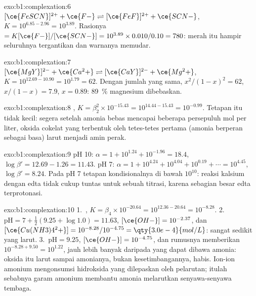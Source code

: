 \begin{solution}{exo:b1:complexation:6}
$[\ce{FeSCN}]^{2+} + \ce{F-} \rightleftharpoons [\ce{FeF}]^{2+} + \ce{SCN-}$,
$K = 10^{6.85 - 2.96} = 10^{3.89}$. Rasionya $= K[\ce{F-}]/[\ce{SCN-}] =
10^{3.89} \times 0.010/0.10 = 780$:  merah itu hampir seluruhnya
tergantikan dan warnanya memudar.
\end{solution}

\begin{solution}{exo:b1:complexation:7}
$[\ce{MgY}]^{2-} + \ce{Ca^2+} \rightleftharpoons [\ce{CaY}]^{2-} + \ce{Mg^2+}$,
$K = 10^{12.69 - 10.90} = 10^{1.79} = 62$. Dengan jumlah yang sama,
$x^2/(1 - x)^2 = 62$, $x/(1 - x) = 7.9$, $x = 0.89$: \qty{89}{\percent}
magnesium dibebaskan.
\end{solution}

\begin{solution}{exo:b1:complexation:8}
, $K = \beta_2^2 \times
10^{-15.43} = 10^{14.44 - 15.43} = 10^{-0.99}$. Tetapan itu tidak kecil:
segera setelah amonia bebas mencapai beberapa persepuluh mol per liter,
oksida cokelat yang terbentuk oleh tetes-tetes pertama (amonia berperan
sebagai basa) larut menjadi  amin perak.
\end{solution}

\begin{solution}{exo:b1:complexation:9}
pH 10: $\alpha = 1 + 10^{1.24} + 10^{-1.96} = 18.4$, $\log\beta' = 12.69 -
1.26 = 11.43$. pH 7: $\alpha = 1 + 10^{4.24} + 10^{4.04} + 10^{0.19} +
\cdots = 10^{4.45}$, $\log\beta' = 8.24$. Pada pH 7 tetapan kondisionalnya
di bawah $10^{10}$: reaksi kalsium dengan edta tidak cukup tuntas untuk
sebuah titrasi, karena sebagian besar edta terprotonasi.
\end{solution}

\begin{solution}{exo:b1:complexation:10}
1.~, $K = \beta_4 \times
10^{-20.64} = 10^{12.36 - 20.64} = 10^{-8.28}$.
2.~$\mathrm{pH} = 7 + \frac12(9.25 + \log 1.0) = 11.63$, $[\ce{OH-}] =
10^{-2.37}$, dan $[\ce{Cu(NH3)4^2+}] = 10^{-8.28}/10^{-4.75} =
\qty{3.0e-4}{mol/L}$: sangat sedikit yang larut.
3.~$\mathrm{pH} = 9.25$, $[\ce{OH-}] = 10^{-4.75}$, dan rumusnya memberikan
$10^{-8.28 + 9.50} = 10^{1.22}$, jauh lebih banyak daripada yang dapat
dibawa amonia: oksida itu larut sampai amonianya, bukan kesetimbangannya,
habis. Ion-ion amonium mengonsumsi hidroksida yang dilepaskan oleh
pelarutan; itulah sebabnya garam amonium membantu amonia melarutkan
senyawa-senyawa tembaga.
\end{solution}

